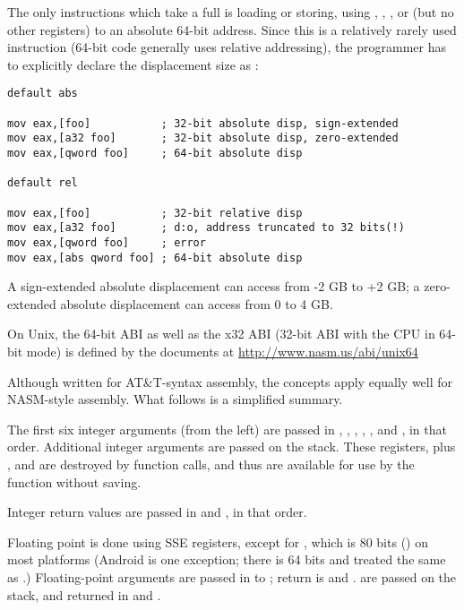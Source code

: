 The only instructions which take a full 
is loading or storing, using , , , 
or  (but no other registers) to an absolute 64-bit address.
Since this is a relatively rarely used instruction (64-bit code
generally uses relative addressing), the programmer has to explicitly
declare the displacement size as :

\begin{lstlisting}
default abs

mov eax,[foo]           ; 32-bit absolute disp, sign-extended
mov eax,[a32 foo]       ; 32-bit absolute disp, zero-extended
mov eax,[qword foo]     ; 64-bit absolute disp

default rel

mov eax,[foo]           ; 32-bit relative disp
mov eax,[a32 foo]       ; d:o, address truncated to 32 bits(!)
mov eax,[qword foo]     ; error
mov eax,[abs qword foo] ; 64-bit absolute disp
\end{lstlisting}

A sign-extended absolute displacement can access from -2 GB to +2 GB;
a zero-extended absolute displacement can access from 0 to 4 GB.


On Unix, the 64-bit ABI as well as the x32 ABI (32-bit ABI with the
CPU in 64-bit mode) is defined by the documents at
\href{http://www.nasm.us/abi/unix64}{http://www.nasm.us/abi/unix64}

Although written for AT\&T-syntax assembly, the concepts apply equally
well for NASM-style assembly. What follows is a simplified summary.

The first six integer arguments (from the left) are passed in ,
, , , , and , in that
order. Additional integer arguments are passed on the stack. These
registers, plus ,  and  are destroyed
by function calls, and thus are available for use by the function
without saving.

Integer return values are passed in  and ,
in that order.

Floating point is done using SSE registers, except for ,
which is 80 bits () on most platforms (Android is
one exception; there  is 64 bits and treated the same
as .) Floating-point arguments are passed in  to
; return is  and . 
are passed on the stack, and returned in  and .

